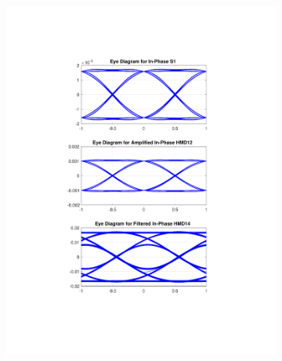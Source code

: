 \begin{figure}[H]
	\centering
	\begin{subfigure}{.45\textwidth}
		\centering
		\includegraphics[clip, trim=5cm 4cm 5cm 4cm,
			width=\textwidth]{./sdf/m_qam_system/figures/eyes/if_nn_p_60_09_rc.pdf}
	\end{subfigure}
	\begin{subfigure}{.45\textwidth}
		\centering

\end{subfigure}
\end{figure}
